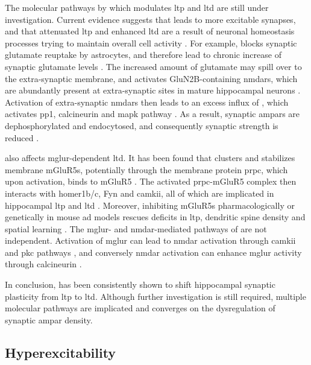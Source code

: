 The molecular pathways by which \abeta{} modulates \gls{ltp} and \gls{ltd} are still under investigation. Current evidence suggests that \abeta{} leads to more excitable synapses, and that attenuated \gls{ltp} and enhanced \gls{ltd} are a result of neuronal homeostasis processes trying to maintain overall cell activity \citep{guntupalli16, jang16}. For example, \abeta{} blocks synaptic glutamate reuptake by astrocytes, and therefore lead to chronic increase of synaptic glutamate levels \citep{matos08, li09}. The increased amount of glutamate may spill over to the extra-synaptic membrane, and activates GluN2B-containing \glspl{nmdar}, which are abundantly present at extra-synaptic sites in mature hippocampal neurons \citep{citri08, li11, shipton14}. Activation of extra-synaptic \glspl{nmdar} then leads to an excess influx of , which activates \gls{pp1}, calcineurin and \gls{mapk} pathway \citep{hsieh06, shankar07, zhao10}. As a result, synaptic \glspl{ampar} are dephosphorylated and endocytosed, and consequently synaptic strength is reduced \citep{hsieh06, liu10, minanomolina11}. 

\abeta{} also affects \gls{mglur}-dependent \gls{ltd}. It has been found that \abeta{} clusters and stabilizes membrane mGluR5s, potentially through the membrane protein \gls{prpc}, which upon \abeta{} activation, binds to mGluR5 \citep{renner10, um13}. The activated \gls{prpc}-mGluR5 complex then interacts with homer1b/c, Fyn and \gls{camkii}, all of which are implicated in hippocampal \gls{ltp} and \gls{ltd} \citep{raka15, haas16}. Moreover, inhibiting mGluR5s pharmacologically or genetically in mouse \gls{ad} models rescues deficits in \gls{ltp}, dendritic spine density and spatial learning \citep{rammes11, hu14, um13, hamilton14}. The \gls{mglur}- and \gls{nmdar}-mediated pathways of \abeta{} are not independent. Activation of \gls{mglur} can lead to \gls{nmdar} activation through \gls{camkii} and \gls{pkc} pathways \citep{chen11, jin15}, and conversely \gls{nmdar} activation can enhance \gls{mglur} activity through calcineurin \citep{alagarsamy99, alagarsamy05}. 

In conclusion, \abeta{} has been consistently shown to shift hippocampal synaptic plasticity from \gls{ltp} to \gls{ltd}. Although further investigation is still required, multiple molecular pathways are implicated and converges on the dysregulation of synaptic \gls{ampar} density. 

\subsection{Hyperexcitability}

